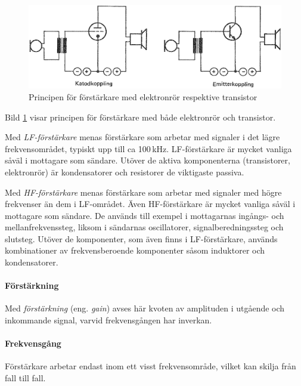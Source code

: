 \begin{figure}
\includegraphics[width=\textwidth]{images/cropped_pdfs/bild_2_3-41.pdf}
\caption{Principen för förstärkare med elektronrör respektive transistor}
\label{fig:BildII3-41}
\end{figure}

Bild \ref{fig:BildII3-41} visar principen för förstärkare med både elektronrör
och transistor.

Med \emph{LF-förstärkare} menas förstärkare som arbetar med signaler i
det lägre frekvensområdet, typiskt upp till ca 100\,kHz.
LF-förstärkare är mycket vanliga såväl i mottagare som sändare.
Utöver de aktiva komponenterna (transistorer, elektronrör) är kondensatorer
och resistorer de viktigaste passiva.

Med \emph{HF-förstärkare} menas förstärkare som arbetar med signaler
med högre frekvenser än dem i LF-området.
Även HF-förstärkare är mycket vanliga såväl i mottagare som sändare.
De används till exempel i mottagarnas ingångs- och mellanfrekvenssteg, liksom i
sändarnas oscillatorer, signalberedningssteg och slutsteg.
Utöver de komponenter, som även finns i LF-förstärkare, används kombinationer
av frekvensberoende komponenter såsom induktorer och kondensatorer.

\paragraph{Förstärkning}

Med \emph{förstärkning} (eng. \emph{gain}) avses här kvoten av amplituden i
utgående och inkommande signal, varvid frekvensgången har inverkan.

\paragraph{Frekvensgång}
Förstärkare arbetar endast inom ett visst frekvensområde, vilket kan
skilja från fall till fall.


